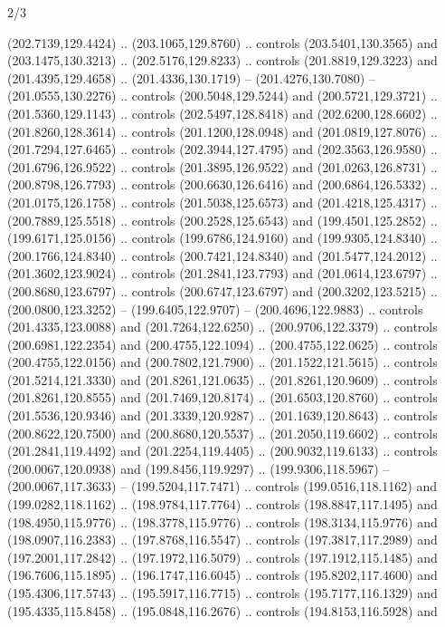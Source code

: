 \begin{flagdescription}{2/3}
\begin{scope}[xshift=0.5\flaglength,yshift=0.5\flagwidth,scale=\flagwidth/180]
\begin{scope}[y=0.8pt, x=0.8pt, yscale=-1,shift={(-168.75,-108.75)}]
  (202.7139,129.4424) .. (203.1065,129.8760) .. controls (203.5401,130.3565) and
  (203.1475,130.3213) .. (202.5176,129.8233) .. controls (201.8819,129.3223) and
  (201.4395,129.4658) .. (201.4336,130.1719) -- (201.4276,130.7080) --
  (201.0555,130.2276) .. controls (200.5048,129.5244) and (200.5721,129.3721) ..
  (201.5360,129.1143) .. controls (202.5497,128.8418) and (202.6200,128.6602) ..
  (201.8260,128.3614) .. controls (201.1200,128.0948) and (201.0819,127.8076) ..
  (201.7294,127.6465) .. controls (202.3944,127.4795) and (202.3563,126.9580) ..
  (201.6796,126.9522) .. controls (201.3895,126.9522) and (201.0263,126.8731) ..
  (200.8798,126.7793) .. controls (200.6630,126.6416) and (200.6864,126.5332) ..
  (201.0175,126.1758) .. controls (201.5038,125.6573) and (201.4218,125.4317) ..
  (200.7889,125.5518) .. controls (200.2528,125.6543) and (199.4501,125.2852) ..
  (199.6171,125.0156) .. controls (199.6786,124.9160) and (199.9305,124.8340) ..
  (200.1766,124.8340) .. controls (200.7421,124.8340) and (201.5477,124.2012) ..
  (201.3602,123.9024) .. controls (201.2841,123.7793) and (201.0614,123.6797) ..
  (200.8680,123.6797) .. controls (200.6747,123.6797) and (200.3202,123.5215) ..
  (200.0800,123.3252) -- (199.6405,122.9707) -- (200.4696,122.9883) .. controls
  (201.4335,123.0088) and (201.7264,122.6250) .. (200.9706,122.3379) .. controls
  (200.6981,122.2354) and (200.4755,122.1094) .. (200.4755,122.0625) .. controls
  (200.4755,122.0156) and (200.7802,121.7900) .. (201.1522,121.5615) .. controls
  (201.5214,121.3330) and (201.8261,121.0635) .. (201.8261,120.9609) .. controls
  (201.8261,120.8555) and (201.7469,120.8174) .. (201.6503,120.8760) .. controls
  (201.5536,120.9346) and (201.3339,120.9287) .. (201.1639,120.8643) .. controls
  (200.8622,120.7500) and (200.8680,120.5537) .. (201.2050,119.6602) .. controls
  (201.2841,119.4492) and (201.2254,119.4405) .. (200.9032,119.6133) .. controls
  (200.0067,120.0938) and (199.8456,119.9297) .. (199.9306,118.5967) --
  (200.0067,117.3633) -- (199.5204,117.7471) .. controls (199.0516,118.1162) and
  (199.0282,118.1162) .. (198.9784,117.7764) .. controls (198.8847,117.1495) and
  (198.4950,115.9776) .. (198.3778,115.9776) .. controls (198.3134,115.9776) and
  (198.0907,116.2383) .. (197.8768,116.5547) .. controls (197.3817,117.2989) and
  (197.2001,117.2842) .. (197.1972,116.5079) .. controls (197.1912,115.1485) and
  (196.7606,115.1895) .. (196.1747,116.6045) .. controls (195.8202,117.4600) and
  (195.4306,117.5743) .. (195.5917,116.7715) .. controls (195.7177,116.1329) and
  (195.4335,115.8458) .. (195.0848,116.2676) .. controls (194.8153,116.5928) and

\end{scope}
\end{scope}
\end{flagdescription}
